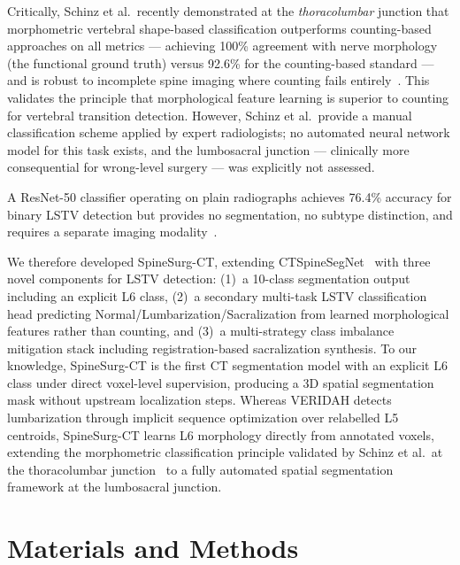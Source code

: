 \documentclass{article}
\begin{document}
Critically, Schinz et al.\ recently demonstrated at the \textit{thoracolumbar}
junction that morphometric vertebral shape-based classification outperforms
counting-based approaches on all metrics --- achieving 100\% agreement with
nerve morphology (the functional ground truth) versus 92.6\% for the
counting-based standard --- and is robust to incomplete spine imaging where
counting fails entirely~\citep{schinz2025}. This validates the principle that
morphological feature learning is superior to counting for vertebral transition
detection. However, Schinz et al.\ provide a manual classification scheme
applied by expert radiologists; no automated neural network model for this task
exists, and the lumbosacral junction --- clinically more consequential for
wrong-level surgery --- was explicitly not assessed.

A ResNet-50 classifier operating on plain radiographs achieves 76.4\% accuracy
for binary LSTV detection but provides no segmentation, no subtype distinction,
and requires a separate imaging modality~\citep{kwak2025}.

We therefore developed SpineSurg-CT, extending
CTSpineSegNet~\citep{li2025spinenet} with three novel components for LSTV
detection: (1)~a 10-class segmentation output including an explicit L6 class,
(2)~a secondary multi-task LSTV classification head predicting
Normal/Lumbarization/Sacralization from learned morphological features rather
than counting, and (3)~a multi-strategy class imbalance mitigation stack
including registration-based sacralization synthesis. To our knowledge, SpineSurg-CT is the first CT segmentation model
with an explicit L6 class under direct voxel-level supervision, producing a 3D
spatial segmentation mask without upstream localization steps. Whereas VERIDAH
detects lumbarization through implicit sequence optimization over relabelled L5
centroids, SpineSurg-CT learns L6 morphology directly from annotated voxels,
extending the morphometric classification principle validated by Schinz et al.\
at the thoracolumbar junction~\citep{schinz2025} to a fully automated spatial
segmentation framework at the lumbosacral junction.

\section{Materials and Methods}
\end{document}
